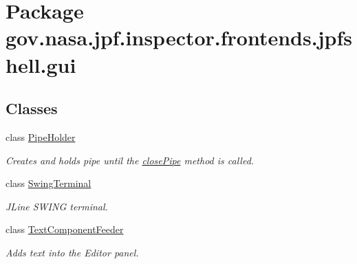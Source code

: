 \hypertarget{namespacegov_1_1nasa_1_1jpf_1_1inspector_1_1frontends_1_1jpfshell_1_1gui}{}\section{Package gov.\+nasa.\+jpf.\+inspector.\+frontends.\+jpfshell.\+gui}
\label{namespacegov_1_1nasa_1_1jpf_1_1inspector_1_1frontends_1_1jpfshell_1_1gui}
\subsection*{Classes}
\begin{DoxyCompactItemize}
\item 
class \hyperlink{classgov_1_1nasa_1_1jpf_1_1inspector_1_1frontends_1_1jpfshell_1_1gui_1_1_pipe_holder}{Pipe\+Holder}
\begin{DoxyCompactList}\small\item\em Creates and holds pipe until the \hyperlink{classgov_1_1nasa_1_1jpf_1_1inspector_1_1frontends_1_1jpfshell_1_1gui_1_1_pipe_holder_ad2c1213baea1c64fa194fd24de53f25e}{close\+Pipe} method is called. \end{DoxyCompactList}\item 
class \hyperlink{classgov_1_1nasa_1_1jpf_1_1inspector_1_1frontends_1_1jpfshell_1_1gui_1_1_swing_terminal}{Swing\+Terminal}
\begin{DoxyCompactList}\small\item\em J\+Line S\+W\+I\+NG terminal. \end{DoxyCompactList}\item 
class \hyperlink{classgov_1_1nasa_1_1jpf_1_1inspector_1_1frontends_1_1jpfshell_1_1gui_1_1_text_component_feeder}{Text\+Component\+Feeder}
\begin{DoxyCompactList}\small\item\em Adds text into the Editor panel. \end{DoxyCompactList}\end{DoxyCompactItemize}
